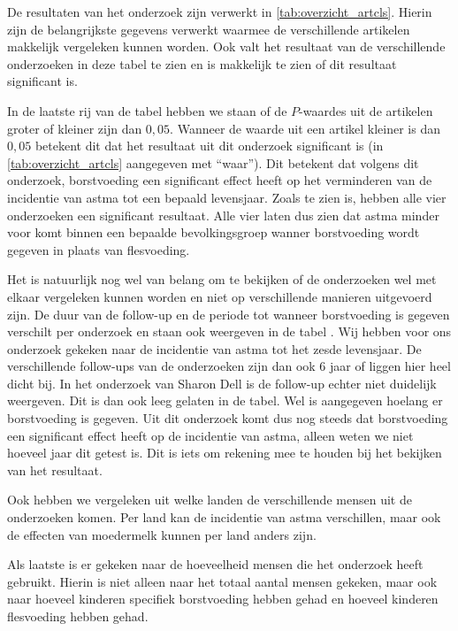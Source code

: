 \documentclass[abstract=true]{scrartcl}
\begin{document}
De resultaten van het onderzoek zijn verwerkt in \cref{tab:overzicht_artcls}. Hierin zijn de belangrijkste gegevens verwerkt waarmee de verschillende artikelen makkelijk vergeleken kunnen worden. Ook valt het resultaat van de verschillende onderzoeken in deze tabel te zien en is makkelijk te zien of dit resultaat significant is. 

In de laatste rij van de tabel hebben we staan of de $P$-waardes uit de artikelen groter of kleiner zijn dan $0,05$. Wanneer de waarde uit een artikel kleiner is dan $0,05$ betekent dit dat het resultaat uit dit onderzoek significant is (in \cref{tab:overzicht_artcls} aangegeven met “waar”). Dit betekent dat volgens dit onderzoek, borstvoeding een significant effect heeft op het verminderen van de incidentie van astma tot een bepaald levensjaar. Zoals te zien is, hebben alle vier onderzoeken een significant resultaat. Alle vier  laten dus zien dat astma minder voor komt binnen een bepaalde bevolkingsgroep wanner borstvoeding wordt gegeven in plaats van flesvoeding. 

Het is natuurlijk nog wel van belang om te bekijken of de onderzoeken wel met elkaar vergeleken kunnen worden en niet op verschillende manieren uitgevoerd zijn. De duur van de follow-up en de periode tot wanneer borstvoeding is gegeven verschilt per onderzoek en staan ook weergeven in de tabel . Wij hebben voor ons onderzoek gekeken naar de incidentie van astma tot het zesde levensjaar. De verschillende follow-ups van de onderzoeken zijn dan ook 6 jaar of liggen hier heel dicht bij. In het onderzoek van Sharon Dell is de follow-up echter niet duidelijk weergeven. Dit is dan ook leeg gelaten in de tabel. Wel is aangegeven hoelang er borstvoeding is gegeven. Uit dit onderzoek komt dus nog steeds dat borstvoeding een significant effect heeft op de incidentie van astma, alleen weten we niet hoeveel jaar dit getest is. Dit is iets om rekening mee te houden bij het bekijken van het resultaat. 

Ook hebben we vergeleken uit welke landen de verschillende mensen uit de onderzoeken komen. Per land kan de incidentie van astma verschillen, maar ook de effecten van moedermelk kunnen per land anders zijn. 

Als laatste is er gekeken naar de hoeveelheid mensen die het onderzoek heeft gebruikt. Hierin is niet alleen naar het totaal aantal mensen gekeken, maar ook naar hoeveel kinderen specifiek borstvoeding hebben gehad en hoeveel kinderen flesvoeding hebben gehad. 
\end{document}
